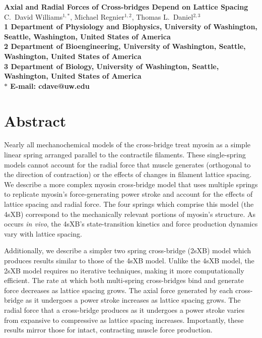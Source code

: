 \documentclass[10pt]{article}
\date{} %
\begin{document}
\begin{flushleft}
{\Large
\textbf{Axial and Radial Forces of Cross-bridges Depend on Lattice Spacing}
}
\\
C.\ David Williams$^{1,\ast}$, 
Michael Regnier$^{1,2}$, 
Thomas L.\ Daniel$^{2,3}$
\\
\bf{1} Department of Physiology and Biophysics, University of Washington, Seattle, Washington, United States of America
\\
\bf{2} Department of Bioengineering, University of Washington, Seattle, Washington, United States of America
\\
\bf{3} Department of Biology, University of Washington, Seattle, Washington, United States of America
\\
$\ast$ E-mail: cdave@uw.edu
\end{flushleft}

\section*{Abstract} %
Nearly all mechanochemical models of the cross-bridge treat myosin as a simple linear spring arranged parallel to the contractile filaments.
These single-spring models cannot account for the radial force that muscle generates (orthogonal to the direction of contraction) or the effects of changes in filament lattice spacing. 
We describe a more complex myosin cross-bridge model that uses multiple springs to replicate myosin's force-generating power stroke and account for the effects of lattice spacing and radial force. 
The four springs which comprise this model (the 4sXB) correspond to the mechanically relevant portions of myosin's structure.
As occurs \emph{in vivo}, the 4sXB's state-transition kinetics and force production dynamics vary with lattice spacing.

Additionally, we describe a simpler two spring cross-bridge (2sXB) model which produces results similar to those of the 4sXB model.
Unlike the 4sXB model, the 2sXB model requires no iterative techniques, making it more computationally efficient.
The rate at which both multi-spring cross-bridges bind and generate force decreases as lattice spacing grows. 
The axial force generated by each cross-bridge as it undergoes a power stroke increases as lattice spacing grows.
The radial force that a cross-bridge produces as it undergoes a power stroke varies from expansive to compressive as lattice spacing increases.
Importantly, these results mirror those for intact, contracting muscle force production.
\end{document}
